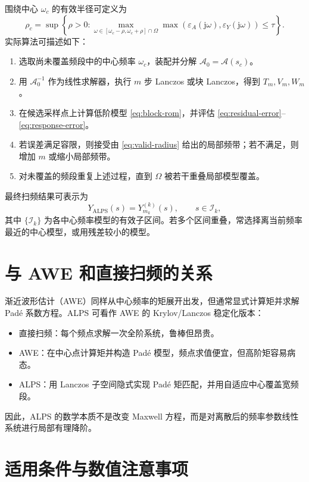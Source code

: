 \documentclass[UTF8,a4paper,11pt]{ctexart}
\newcommand{\jj}{\mathrm{j}}
\newcommand{\cA}{\mathcal{A}}
\newcommand{\cI}{\mathcal{I}}
\begin{document}
围绕中心 $\omega_c$ 的有效半径可定义为
\begin{equation}
    \rho_c
    =
    \sup\left\{\rho>0:
    \max_{\omega\in[\omega_c-\rho,\omega_c+\rho]\cap\Omega}
    \max(\varepsilon_A(\jj\omega),\varepsilon_Y(\jj\omega))
    \le\tau
    \right\}.
    \label{eq:valid-radius}
\end{equation}
实际算法可描述如下：
\begin{enumerate}
    \item 选取尚未覆盖频段中的中心频率 $\omega_c$，装配并分解 $\cA_0=\cA(s_c)$。
    \item 用 $\cA_0^{-1}$ 作为线性求解器，执行 $m$ 步 Lanczos 或块 Lanczos，得到 $T_m,V_m,W_m$。
    \item 在候选采样点上计算低阶模型 \eqref{eq:block-rom}，并评估 \eqref{eq:residual-error}--\eqref{eq:response-error}。
    \item 若误差满足容限，则接受由 \eqref{eq:valid-radius} 给出的局部频带；若不满足，则增加 $m$ 或缩小局部频带。
    \item 对未覆盖的频段重复上述过程，直到 $\Omega$ 被若干重叠局部模型覆盖。
\end{enumerate}
最终扫频结果可表示为
\begin{equation}
    Y_{\mathrm{ALPS}}(s)=Y_{m_k}^{(k)}(s),
    \qquad
    s\in \cI_k,
\end{equation}
其中 $\{\cI_k\}$ 为各中心频率模型的有效子区间。若多个区间重叠，常选择离当前频率最近的中心模型，或用残差较小的模型。

\section{与 AWE 和直接扫频的关系}

渐近波形估计（AWE）同样从中心频率的矩展开出发，但通常显式计算矩并求解 Padé 系数方程。ALPS 可看作 AWE 的 Krylov/Lanczos 稳定化版本：
\begin{itemize}
    \item 直接扫频：每个频点求解一次全阶系统，鲁棒但昂贵。
    \item AWE：在中心点计算矩并构造 Padé 模型，频点求值便宜，但高阶矩容易病态。
    \item ALPS：用 Lanczos 子空间隐式实现 Padé 矩匹配，并用自适应中心覆盖宽频段。
\end{itemize}
因此，ALPS 的数学本质不是改变 Maxwell 方程，而是对离散后的频率参数线性系统进行局部有理降阶。

\section{适用条件与数值注意事项}
\end{document}

